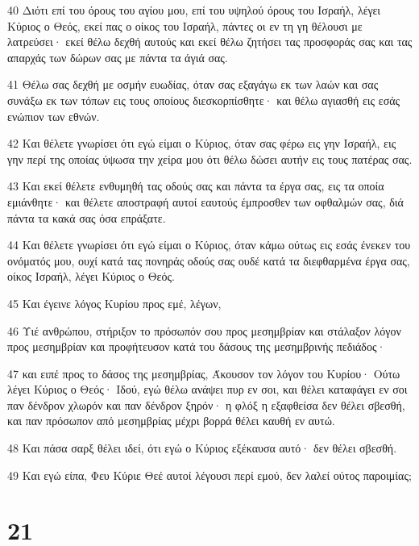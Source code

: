 \par 40 Διότι επί του όρους του αγίου μου, επί του υψηλού όρους του Ισραήλ, λέγει Κύριος ο Θεός, εκεί πας ο οίκος του Ισραήλ, πάντες οι εν τη γη θέλουσι με λατρεύσει· εκεί θέλω δεχθή αυτούς και εκεί θέλω ζητήσει τας προσφοράς σας και τας απαρχάς των δώρων σας με πάντα τα άγιά σας.
\par 41 Θέλω σας δεχθή με οσμήν ευωδίας, όταν σας εξαγάγω εκ των λαών και σας συνάξω εκ των τόπων εις τους οποίους διεσκορπίσθητε· και θέλω αγιασθή εις εσάς ενώπιον των εθνών.
\par 42 Και θέλετε γνωρίσει ότι εγώ είμαι ο Κύριος, όταν σας φέρω εις γην Ισραήλ, εις γην περί της οποίας ύψωσα την χείρα μου ότι θέλω δώσει αυτήν εις τους πατέρας σας.
\par 43 Και εκεί θέλετε ενθυμηθή τας οδούς σας και πάντα τα έργα σας, εις τα οποία εμιάνθητε· και θέλετε αποστραφή αυτοί εαυτούς έμπροσθεν των οφθαλμών σας, διά πάντα τα κακά σας όσα επράξατε.
\par 44 Και θέλετε γνωρίσει ότι εγώ είμαι ο Κύριος, όταν κάμω ούτως εις εσάς ένεκεν του ονόματός μου, ουχί κατά τας πονηράς οδούς σας ουδέ κατά τα διεφθαρμένα έργα σας, οίκος Ισραήλ, λέγει Κύριος ο Θεός.
\par 45 Και έγεινε λόγος Κυρίου προς εμέ, λέγων,
\par 46 Υιέ ανθρώπου, στήριξον το πρόσωπόν σου προς μεσημβρίαν και στάλαξον λόγον προς μεσημβρίαν και προφήτευσον κατά του δάσους της μεσημβρινής πεδιάδος·
\par 47 και ειπέ προς το δάσος της μεσημβρίας, Άκουσον τον λόγον του Κυρίου· Ούτω λέγει Κύριος ο Θεός· Ιδού, εγώ θέλω ανάψει πυρ εν σοι, και θέλει καταφάγει εν σοι παν δένδρον χλωρόν και παν δένδρον ξηρόν· η φλόξ η εξαφθείσα δεν θέλει σβεσθή, και παν πρόσωπον από μεσημβρίας μέχρι βορρά θέλει καυθή εν αυτώ.
\par 48 Και πάσα σαρξ θέλει ιδεί, ότι εγώ ο Κύριος εξέκαυσα αυτό· δεν θέλει σβεσθή.
\par 49 Και εγώ είπα, Φευ Κύριε Θεέ αυτοί λέγουσι περί εμού, δεν λαλεί ούτος παροιμίας;

\chapter{21}

